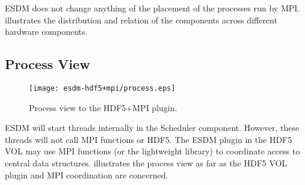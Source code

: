 ESDM does not change anything of the placement of the processes run by MPI.
 illustrates the distribution and relation of the components across different hardware components.


\subsection{Process View}

\begin{figure}
	\centering
	\texttt{[image: esdm-hdf5+mpi/process.eps]}
	\caption{Process view to the HDF5+MPI plugin.}
	\label{fig:esdm hdf5 process view}
\end{figure}

ESDM will start threads internally in the Scheduler component. However, these threads will not call MPI functions or HDF5.
The ESDM plugin in the HDF5 VOL may use MPI functions (or the lightweight library) to coordinate access to central data structures.
 illustrates the process view as far as the HDF5 VOL plugin and MPI coordination are concerned.
